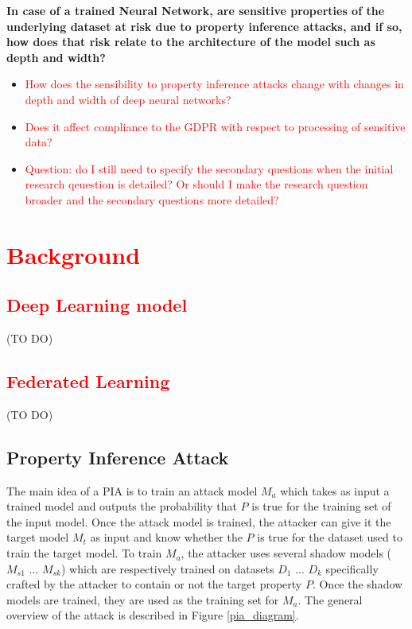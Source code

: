 \documentclass[11pt]{article}
\begin{document}
\textbf{In case of a trained Neural Network, are sensitive properties of the underlying dataset at risk due to property inference attacks, and if so, how does that risk relate to the architecture of the model such as depth and width?}
\begin{itemize}
\item{\textcolor{red}{How does the sensibility to property inference attacks change with changes in depth and width of deep neural networks?}}
\item{\textcolor{red}{Does it affect compliance to the GDPR with respect to processing of sensitive data?}}
\item{\textcolor{red}{Question: do I still need to specify the secondary questions when the initial research qeuestion is detailed? Or should I make the research question broader and the secondary questions more detailed?}}
\end{itemize}

\section{\textcolor{red}{Background}}

\subsection{\textcolor{red}{Deep Learning model}}
(TO DO)
\subsection{\textcolor{red}{Federated Learning}}
(TO DO)
\subsection{Property Inference Attack}

The main idea of a PIA is to train an attack model $M_a$ which takes as input a trained model and outputs the probability that $P$ is true for the training set of the input model. Once the attack model is trained, the attacker can give it the target model $M_t$ as input and know whether the $P$ is true for the dataset used to train the target model. To train $M_a$, the attacker uses several shadow models ($M_{s1}$ ... $M_{sk}$) which are respectively trained on datasets $D_1$ ... $D_k$ specifically crafted by the attacker to contain or not the target property $P$. Once the shadow models are trained, they are used as the training set for $M_a$. The general overview of the attack is described in Figure \ref{pia_diagram}.\\
\end{document}
